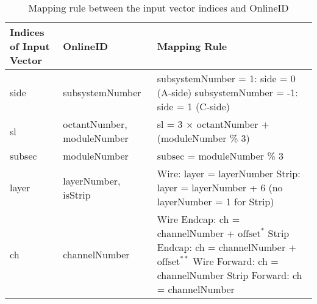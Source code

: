 \begin{table}[htbp]
  \centering
  \caption{Mapping rule between the input vector indices and OnlineID}
  \label{tab:OnlineID_vs_vector}
  \begin{tabular}{|p{3cm}|p{4cm}|p{6cm}|}
    \hline
    \textbf{Indices of \newline Input Vector} & \textbf{OnlineID} & \textbf{Mapping Rule} \\
    \hline
    side & subsystemNumber & subsystemNumber = 1: \newline side = 0 (A-side) \newline subsystemNumber = -1: \newline side = 1 (C-side) \\
    \hline
    sl & octantNumber, \newline moduleNumber & sl = 3 $\times$ octantNumber + \newline (moduleNumber \% 3) \\
    \hline
    subsec & moduleNumber & subsec = moduleNumber \% 3 \\
    \hline
    layer & layerNumber, isStrip & Wire: layer = layerNumber \newline Strip: layer = layerNumber + 6 \newline (no layerNumber = 1 for Strip) \\
    \hline
    ch & channelNumber & Wire Endcap: \newline ch = channelNumber + $\text{offset}^{*}$ \newline Strip Endcap: \newline ch = channelNumber + $\text{offset}^{**}$ \newline Wire Forward: \newline ch = channelNumber \newline Strip Forward: \newline ch = channelNumber \\
    \hline
  \end{tabular}
\end{table}